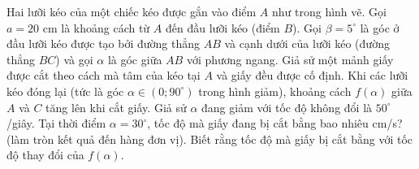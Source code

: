 \begin{ex}%
	Hai lưỡi kéo của một chiếc kéo được gắn vào điểm $A$ như trong hình vẽ. Gọi $a = 20$ cm là khoảng cách từ $A$ đến đầu lưỡi kéo (điểm $B$). Gọi $\beta = 5^\circ$ là góc ở đầu lưỡi kéo được tạo bởi đường thẳng $AB$ và cạnh dưới của lưỡi kéo (đường thẳng $BC$) và gọi $\alpha$ là góc giữa $AB$ với phương ngang. Giả sử một mảnh giấy được cắt theo cách mà tâm của kéo tại $A$ và giấy đều được cố định. Khi các lưỡi kéo đóng lại (tức là góc $\alpha \in (0; 90^\circ)$ trong hình giảm), khoảng cách $f(\alpha)$ giữa $A$ và $C$ tăng lên khi cắt giấy. Giả sử $\alpha$ đang giảm với tốc độ không đổi là $50^\circ$/giây. Tại thời điểm $\alpha = 30^\circ$, tốc độ mà giấy đang bị cắt bằng bao nhiêu cm/s? (làm tròn kết quả đến hàng đơn vị). Biết rằng tốc độ mà giấy bị cắt bằng với tốc độ thay đổi của $f(\alpha)$.
	\begin{center}
	\end{center}
	

\end{ex}
